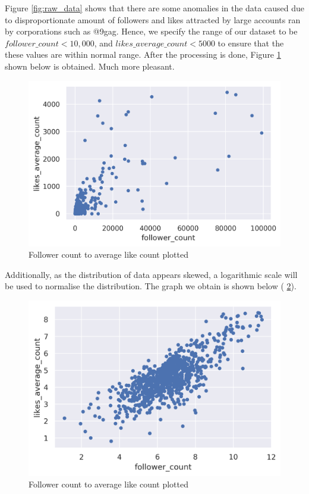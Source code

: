 \documentclass[11pt]{article}
\begin{document}
Figure \ref{fig:raw_data} shows that there are some anomalies in the data caused due to disproportionate amount of followers and likes attracted by large accounts ran by corporations such as @9gag. Hence, we specify the range of our dataset to be $\mathit{follower\_count} < 10,000$, and $\mathit{likes\_average\_count} < 5000$ to ensure that the these values are within normal range. After the processing is done, Figure \ref{fig:processed_data} shown below is obtained. Much more pleasant.

\begin{figure}[H]
  \center
  \includegraphics[width=0.75\linewidth]{images/processed_data_graph.png}
  \caption{Follower count to average like count plotted}
  \label{fig:processed_data}
\end{figure}

Additionally, as the distribution of data appears skewed, a logarithmic scale will be used to normalise the distribution. The graph we obtain is shown below ( \ref{fig:log_data}).

\begin{figure}[H]
  \center
  \includegraphics[width=0.75\linewidth]{images/log_data_graph.png}
  \caption{Follower count to average like count plotted}
  \label{fig:log_data}
\end{figure}
\end{document}
